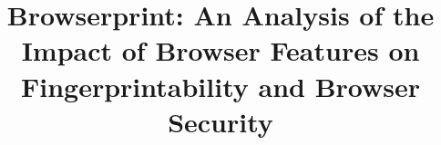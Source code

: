 \documentclass[sigconf, anonymous]{acmart}
\begin{document}
\title{Browserprint: An Analysis of the Impact of Browser Features on Fingerprintability and Browser Security}




\maketitle









\end{document}
